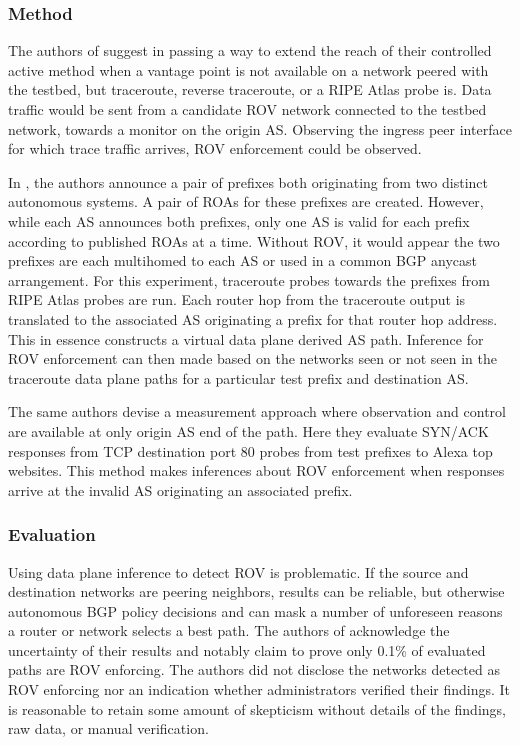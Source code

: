 \documentclass[sigconf]{acmart}
\begin{document}
\subsubsection{Method}

The authors of \cite{reuter_towards_2018} suggest in passing a way to
extend the reach of their controlled active method when a vantage point
is not available on a network peered with the testbed, but traceroute,
reverse traceroute, or a RIPE Atlas probe
is.\cite{katz-bassett_reverse_2010}\cite{ripe_ncc_staff_ripe_2015} Data
traffic would be sent from a candidate ROV network connected to the
testbed network, towards a monitor on the origin AS.  Observing the
ingress peer interface for which trace traffic arrives, ROV enforcement
could be observed.

In \cite{hlavacek_practical_2018}, the authors announce a pair of
prefixes both originating from two distinct autonomous systems.  A pair
of ROAs for these prefixes are created.  However, while each AS
announces both prefixes, only one AS is valid for each prefix according
to published ROAs at a time.  Without ROV, it would appear the two
prefixes are each multihomed to each AS or used in a common BGP anycast
arrangement.  For this experiment, traceroute probes towards the
prefixes from RIPE Atlas probes are run.  Each router hop from the
traceroute output is translated to the associated AS originating a
prefix for that router hop address.  This in essence constructs a
virtual data plane derived AS path.  Inference for ROV enforcement can
then made based on the networks seen or not seen in the traceroute data
plane paths for a particular test prefix and destination AS.

The same authors devise a measurement approach where observation and
control are available at only origin AS end of the path.   Here they
evaluate SYN/ACK responses from TCP destination port 80 probes from test
prefixes to Alexa top websites.\cite{noauthor_alexa_2018}  This method
makes inferences about ROV enforcement when responses arrive at the
invalid AS originating an associated prefix.

\subsubsection{Evaluation}

Using data plane inference to detect ROV is problematic.  If the source
and destination networks are peering neighbors, results can be reliable,
but otherwise autonomous BGP policy decisions and can mask a number of
unforeseen reasons a router or network selects a best path.  The authors
of \cite{hlavacek_practical_2018} acknowledge the uncertainty of their
results and notably claim to prove only 0.1\% of evaluated paths are ROV
enforcing.  The authors did not disclose the networks detected as ROV
enforcing nor an indication whether administrators verified their
findings.  It is reasonable to retain some amount of skepticism without
details of the findings, raw data, or manual verification.
\end{document}
